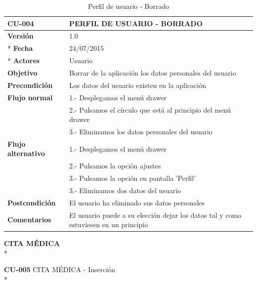 \documentclass[../pfc.tex]{subfiles}
\begin{document}
	\begin{table}[H]
		\centering
		\begin{tabular}[t]{|p{3cm}|p{9.5cm}|}
			\hline \textbf{CU-004} & \textbf{PERFIL DE USUARIO - BORRADO} \\*
			\hline\hline \textbf{Versión} & 1.0 \\ *
			\hline\hline \textbf{Fecha} & 24/07/2015 \\ *
			\hline\textbf{Actores} 	& Usuario\\*
			\hline \textbf{Objetivo} & Borrar de la aplicación los datos personales del usuario\\* 			
			\hline \textbf{Precondición} & Los datos del usuario existen en la aplicación \\* 
			\hline \textbf{Flujo normal} & 1.- Desplegamos el menú drawer \\* 
			& 2.- Pulsamos el círculo que está al principio del menú drawer\\*	
			& 3.- Eliminamos los datos personales del usuario\\*	
			\hline \textbf{Flujo alternativo} & 1.- Desplegamos el menú drawer \\* 
			& 2.- Pulsamos la opción ajustes \\*	
			& 3.- Pulsamos la opción en pantalla 'Perfil' \\*	
			& 3.- Eliminamos dos datos del usuario\\*	
			\hline \textbf{Postcondición} & El usuario ha eliminado sus datos personales\\* 
			\hline \textbf{Comentarios}   & El usuario puede a su elección dejar los datos tal y como estuviesen en un principio\\* 
			\hline
		\end{tabular}
		\caption{Perfil de usuario - Borrado}
		\label{tabla:caso004}

	\end{table}
	
	
	
	\textbf{CITA MÉDICA}\\*

	\textbf{CU-005}	CITA MÉDICA - Inserción\\*
	
\end{document}
